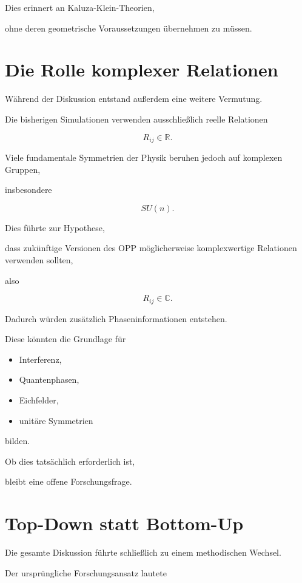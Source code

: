 Dies erinnert an Kaluza-Klein-Theorien,

ohne deren geometrische Voraussetzungen übernehmen zu müssen.

\section*{Die Rolle komplexer Relationen}

Während der Diskussion entstand außerdem eine weitere Vermutung.

Die bisherigen Simulationen verwenden ausschließlich reelle Relationen

\[
R_{ij}
\in
\mathbb{R}.
\]

Viele fundamentale Symmetrien der Physik beruhen jedoch auf komplexen Gruppen,

insbesondere

\[
SU(n).
\]

Dies führte zur Hypothese,

dass zukünftige Versionen des OPP möglicherweise komplexwertige Relationen verwenden sollten,

also

\[
R_{ij}
\in
\mathbb{C}.
\]

Dadurch würden zusätzlich Phaseninformationen entstehen.

Diese könnten die Grundlage für

\begin{itemize}

\item Interferenz,

\item Quantenphasen,

\item Eichfelder,

\item unitäre Symmetrien

\end{itemize}

bilden.

Ob dies tatsächlich erforderlich ist,

bleibt eine offene Forschungsfrage.

\section*{Top-Down statt Bottom-Up}

Die gesamte Diskussion führte schließlich zu einem methodischen Wechsel.

Der ursprüngliche Forschungsansatz lautete

